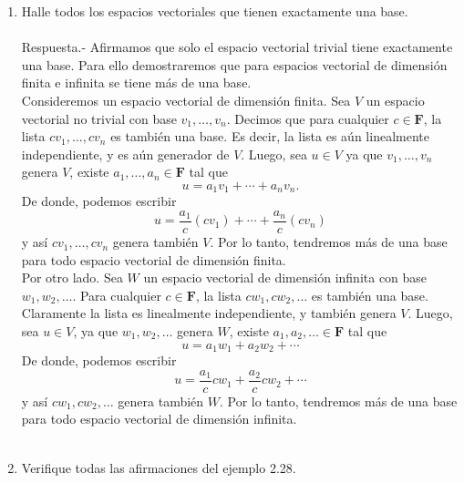 \vspace{.5cm}


\setcounter{mysection}{1}

\begin{enumerate}[\bfseries 1.]

    \item Halle todos los espacios vectoriales que tienen exactamente una base.\\\\ 
	Respuesta.-\; Afirmamos que solo el espacio vectorial trivial tiene exactamente una base. Para ello demostraremos que para espacios vectorial de dimensión finita e infinita se tiene más de una base.\\
	Consideremos un espacio vectorial de dimensión finita. Sea $V$ un espacio vectorial no trivial con base $v_1,\ldots,v_n$. Decimos que para cualquier $c\in \textbf{F}$, la lista $cv_1,\ldots,cv_n$ es también una base. Es decir, la lista es aún linealmente independiente, y es aún generador de $V$. Luego, sea $u\in V$ ya que $v_1,\ldots,v_n$ genera $V$, existe $a_1,\ldots,a_n\in \textbf{F}$ tal que
	$$u=a_1v_1+\cdots+a_nv_n.$$
	De donde, podemos escribir
	$$u=\dfrac{a_1}{c}(cv_1)+\cdots+\dfrac{a_n}{c}(cv_n)$$
	y así $cv_1,\ldots,cv_n$ genera también $V$. Por lo tanto, tendremos más de una base para todo espacio vectorial de dimensión finita.\\
	Por otro lado. Sea $W$ un espacio vectorial de dimensión infinita con base $w_1,w_2,\ldots$. Para cualquier $c\in \textbf{F}$, la lista $cw_1,cw_2,\ldots$ es también una base. Claramente la lista es linealmente independiente, y también genera $V$. Luego, sea $u\in V$, ya que $w_1,w_2,\ldots$ genera $W$, existe $a_1,a_2,\ldots\in \textbf{F}$ tal que
	$$u=a_1w_1+a_2w_2+\cdots$$
	De donde, podemos escribir
	$$u=\dfrac{a_1}{c}cw_1+\dfrac{a_2}{c}cw_2+\cdots$$
	y así $cw_1,cw_2,\ldots$ genera también $W$. Por lo tanto, tendremos más de una base para todo espacio vectorial de dimensión infinita.\\\\


    \item Verifique todas las afirmaciones del ejemplo 2.28.\\
	\begin{enumerate}[(a)]


\end{enumerate}
\end{enumerate}
